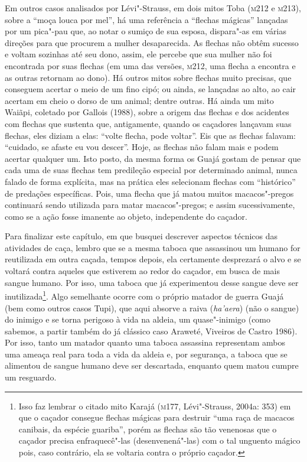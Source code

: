 Em outros casos analisados por Lévi"-Strauss, em dois mitos Toba (\textsc{m}212 e
\textsc{m}213), sobre a ``moça louca por mel'', há uma referência a ``flechas
mágicas'' lançadas por um pica"-pau que, ao notar o sumiço de sua esposa,
dispara"-as em várias direções para que procurem a mulher desaparecida.
As flechas não obtêm sucesso e voltam sozinhas até seu dono, assim, ele
percebe que sua mulher não foi encontrada por suas flechas (em uma das
versões, \textsc{m}212, uma flecha a encontra e as outras retornam ao dono). Há
outros mitos sobre flechas muito precisas, que conseguem acertar o meio
de um fino cipó; ou ainda, se lançadas ao alto, ao cair acertam em cheio
o dorso de um animal; dentre outras. Há ainda um mito Waiãpi, coletado
por Gallois (1988), sobre a origem das flechas e dos acidentes com
flechas que sustenta que, antigamente, quando os caçadores lançavam suas
flechas, eles diziam a elas: ``volte flecha, pode voltar''. Eis que as
flechas falavam: ``cuidado, se afaste eu vou descer''. Hoje, as flechas
não falam mais e podem acertar qualquer um. Isto posto, da mesma forma
os Guajá gostam de pensar que cada uma de suas flechas tem predileção
especial por determinado animal, nunca falado de forma explícita, mas na
prática eles selecionam flechas com ``histórico'' de predações
específicas. Pois, uma flecha que já matou muitos macacos"-pregos
continuará sendo utilizada para matar macacos"-pregos; e assim
sucessivamente, como se a ação fosse imanente ao objeto, independente do
caçador.

Para finalizar este capítulo, em que busquei descrever aspectos técnicos
das atividades de caça, lembro que se a mesma taboca que assassinou um
humano for reutilizada em outra caçada, tempos depois, ela certamente
desprezará o alvo e se voltará contra aqueles que estiverem ao redor do
caçador, em busca de mais sangue humano. Por isso, uma taboca que já
experimentou desse sangue deve ser inutilizada\footnote{Isso faz lembrar
  o citado mito Karajá (\textsc{m}177, Lévi"-Strauss, 2004a: 353) em que o caçador
  consegue flechas mágicas para destruir ``uma raça de macacos canibais,
  da espécie guariba'', porém as flechas são tão venenosas que o caçador
  precisa enfraquecê"-las (desenvenená"-las) com o tal unguento mágico
  pois, caso contrário, ela se voltaria contra o próprio caçador.}. Algo
semelhante ocorre com o próprio matador de guerra Guajá (bem como outros
casos Tupi), que aqui absorve a raiva (\emph{ha'aera}) (não o sangue) do
inimigo e se torna perigoso à vida na aldeia, um quase"-inimigo (como
sabemos, a partir também do já clássico caso Araweté, Viveiros de Castro
1986). Por isso, tanto um matador quanto uma taboca assassina
representam ambos uma ameaça real para toda a vida da aldeia e, por
segurança, a taboca que se alimentou de sangue humano deve ser
descartada, enquanto quem matou cumpre um resguardo.

